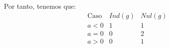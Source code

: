\begin{ejercicio}
\begin{enumerate}
\begin{itemize}
\begin{itemize}
            \end{itemize}

            
        \end{itemize}

        Por tanto, tenemos que:
        \begin{equation*}
            \begin{array}{c|c|c}
                \text{Caso} & Ind(g) & Nul(g) \\ \hline
                a < 0 & 1 & 1 \\
                a=0 & 0 & 2 \\
                a > 0 & 0 & 1 \\           
            \end{array}
        \end{equation*}
        
    \end{enumerate}
\end{ejercicio}

